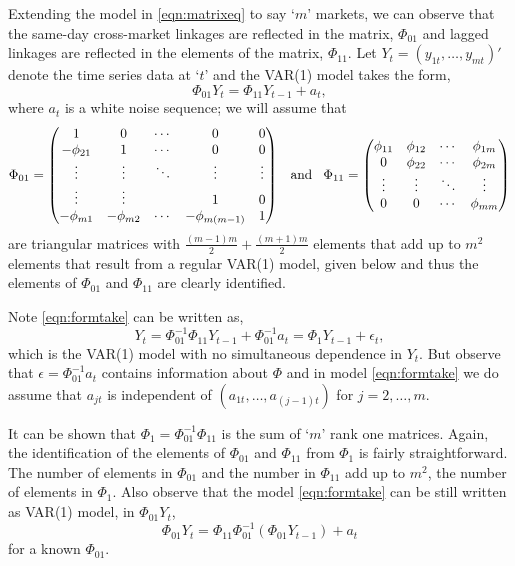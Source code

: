 Extending the model in \eqref{eqn:matrixeq} to say `$m$' markets, we can observe that the same-day cross-market linkages are reflected in the matrix, $\Phi_{01}$ and lagged linkages are reflected in the elements of the matrix, $\Phi_{11}$. Let $Y_t = (y_{1t} ,\ldots, y_{mt})'$ denote the time series data at `$t$' and the VAR(1) model takes the form,
	\begin{equation} \label{eqn:formtake}
	\Phi_{01} Y_t= \Phi_{11} Y_{t-1} + a_t,
	\end{equation}
where $a_t$ is a white noise sequence; we will assume that
	\[
	\Phi_{01}= \begin{pmatrix} 
	1 & 0 & \cdots & 0 & 0 \\
	-\phi_{21} &  1 & \cdots & 0 & 0 \\
	\vdots & \vdots &  \ddots & \vdots & \vdots \\
	\vdots & \vdots & & 1  & 0 \\
	-\phi_{m1} & -\phi_{m2} & \cdots & -\phi_{m(m-1)} &  1 
	\end{pmatrix} \enskip \text{ and } \enskip
	\Phi_{11}= \begin{pmatrix}
	\phi_{11} &  \phi_{12} &  \cdots & \phi_{1m} \\
	0 & \phi_{22} & \cdots & \phi_{2m} \\
	\vdots & \vdots & \ddots & \vdots \\
	0 & 0 & \cdots & \phi_{mm} 
	\end{pmatrix}
	\]
are triangular matrices with $\frac{(m-1)m}{2}+ \frac{(m+1)m}{2}$ elements that add up to $m^2$ elements that result from a regular VAR(1) model, given below and thus the elements of $\Phi_{01}$
and $\Phi_{11}$ are clearly identified. 


Note \eqref{eqn:formtake} can be written as,
	\begin{equation} \label{eqn:rewrittenas}
	Y_t= \Phi_{01}^{-1} \Phi_{11} Y_{t-1} + \Phi_{01}^{-1} a_t = \Phi_1 Y_{t-1} + \epsilon_t,
	\end{equation}
which is the VAR(1) model with no simultaneous dependence in $Y_t$. But observe that $\epsilon= \Phi_{01}^{-1} a_t$ contains information about $\Phi$ and in model \eqref{eqn:formtake} we do assume that  $a_{jt}$ is independent of $(a_{1t},\ldots, a_{(j-1)t})$ for $j = 2,\ldots,m$.


It can be shown that $\Phi_1= \Phi_{01}^{-1} \Phi_{11}$ is the sum of `$m$' rank one matrices. Again, the identification of the elements of $\Phi_{01}$ and $\Phi_{11}$ from $\Phi_1$ is fairly straightforward. The number of elements in $\Phi_{01}$ and the number in $\Phi_{11}$ add up to $m^2$, the number of elements in $\Phi_1$. Also observe that the model \eqref{eqn:formtake} can be still written as VAR(1) model, in $\Phi_{01} Y_t$,
	\begin{equation}\label{eqn:var1phimod}
	\Phi_{01} Y_t = \Phi_{11} \Phi_{01}^{-1} ( \Phi_{01} Y_{t-1}) + a_t
	\end{equation}
for a known $\Phi_{01}$.



